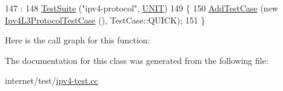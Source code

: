 \begin{DoxyCode}
147                              :
148     \hyperlink{classns3_1_1TestSuite_a904b0c40583b744d30908aeb94636d1a}{TestSuite} (\textcolor{stringliteral}{"ipv4-protocol"}, \hyperlink{classns3_1_1TestSuite_a1ebfcab34ec8161e085e8e3a1855eae0a3885375a3787abf60431f8454b3cadbd}{UNIT})
149   \{
150     \hyperlink{classns3_1_1TestCase_a3718088e3eefd5d6454569d2e0ddd835}{AddTestCase} (\textcolor{keyword}{new} \hyperlink{classIpv4L3ProtocolTestCase}{Ipv4L3ProtocolTestCase} (), TestCase::QUICK);
151   \}
\end{DoxyCode}


Here is the call graph for this function\+:




The documentation for this class was generated from the following file\+:\begin{DoxyCompactItemize}
\item 
internet/test/\hyperlink{ipv4-test_8cc}{ipv4-\/test.\+cc}\end{DoxyCompactItemize}
